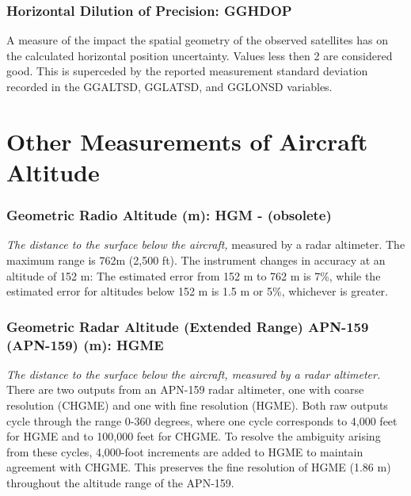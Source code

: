 \documentclass[
]{book}
\begin{document}
\hypertarget{horizontal-dilution-of-precision-gghdop}{%
\subsubsection{Horizontal Dilution of Precision: GGHDOP}\label{horizontal-dilution-of-precision-gghdop}}

A measure of the impact the spatial geometry of the observed satellites has on the calculated horizontal position uncertainty. Values less then 2 are considered good. This is superceded by the reported measurement standard deviation recorded in the GGALTSD, GGLATSD, and GGLONSD variables.

\hypertarget{other-measurements-of-aircraft-altitude}{%
\section{Other Measurements of Aircraft Altitude}\label{other-measurements-of-aircraft-altitude}}

\hypertarget{hgm}{%
\subsubsection*{Geometric Radio Altitude (m): HGM - (obsolete)}\label{hgm}}

\emph{The distance to the surface below the aircraft,} measured by a radar altimeter. The maximum range is 762m (2,500 ft). The instrument changes in accuracy at an altitude of 152 m: The estimated error from 152 m to 762 m is 7\%, while the estimated error for altitudes below 152 m is 1.5 m or 5\%, whichever is greater.

\hypertarget{hgme-159}{%
\subsubsection*{Geometric Radar Altitude (Extended Range) APN-159 (APN-159) (m): HGME}\label{hgme-159}}

\emph{The distance to the surface below the aircraft, measured by a radar altimeter.} There are two outputs from an APN-159 radar altimeter, one with coarse resolution (CHGME) and one with fine resolution (HGME). Both raw outputs cycle through the range 0-360 degrees, where one cycle corresponds to 4,000 feet for HGME and to 100,000 feet for CHGME. To resolve the ambiguity arising from these cycles, 4,000-foot increments are added to HGME to maintain agreement with CHGME. This preserves the fine resolution of HGME (1.86 m) throughout the altitude range of the APN-159.
\end{document}
